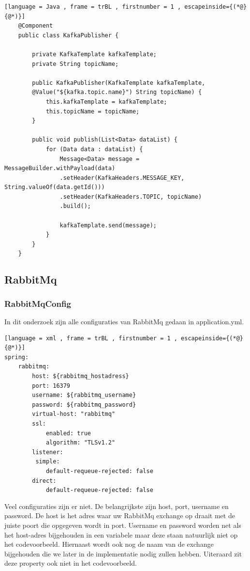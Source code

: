         \begin{lstlisting}[language = Java , frame = trBL , firstnumber = 1 , escapeinside={(*@}{@*)}]
    @Component
    public class KafkaPublisher {
        
        private KafkaTemplate kafkaTemplate;
        private String topicName;
        
        public KafkaPublisher(KafkaTemplate kafkaTemplate,
        @Value("${kafka.topic.name}") String topicName) {
            this.kafkaTemplate = kafkaTemplate;
            this.topicName = topicName;
        }
        
        public void publish(List<Data> dataList) {
            for (Data data : dataList) {
                Message<Data> message = MessageBuilder.withPayload(data)
                .setHeader(KafkaHeaders.MESSAGE_KEY, String.valueOf(data.getId()))
                .setHeader(KafkaHeaders.TOPIC, topicName)
                .build();
                
                kafkaTemplate.send(message);
            }
        }
    }
     \end{lstlisting}
\subsection{RabbitMq}
\subsubsection{RabbitMqConfig}
In dit onderzoek zijn alle configuraties van RabbitMq gedaan in application.yml. 
        \begin{lstlisting}[language = xml , frame = trBL , firstnumber = 1 , escapeinside={(*@}{@*)}]
spring:
    rabbitmq:
        host: ${rabbitmq_hostadress}
        port: 16379
        username: ${rabbitmq_username}
        password: ${rabbitmq_password}
        virtual-host: "rabbitmq"
        ssl:
            enabled: true
            algorithm: "TLSv1.2"
        listener:
         simple:
            default-requeue-rejected: false
        direct:
            default-requeue-rejected: false
     \end{lstlisting}
     
     Veel configuraties zijn er niet. De belangrijkste zijn host, port, username en password. De host is het adres waar uw RabbitMq exchange op draait met de juiste poort die opgegeven wordt in port. Username en password worden net als het host-adres bijgehouden in een variabele maar deze staan natuurlijk niet op het codevoorbeeld. Hiernaast wordt ook nog de naam van de exchange bijgehouden die we later in de implementatie nodig zullen hebben. Uiteraard zit deze property ook niet in het codevoorbeeld.
     
